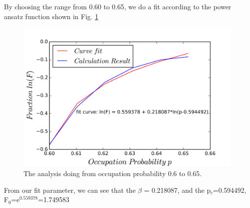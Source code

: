 \documentclass[print,onecolumn]{revtex4-1}
\begin{document}
By choosing the range from 0.60 to 0.65, we do a fit according to the power ansatz function shown in Fig. \ref{tong3}

\begin{figure}[htbp]
\begin{center}
\includegraphics[width=14cm]{P2.png}
\caption{The analysis doing from occupation probability 0.6 to 0.65.}
\label{tong3}
\end{center}
\end{figure}


From our fit parameter, we can see that the $\beta$ = 0.218087, and the p$_c$=0.594492, F$_0$=e$^0.559378$=1.749583
\end{document}
